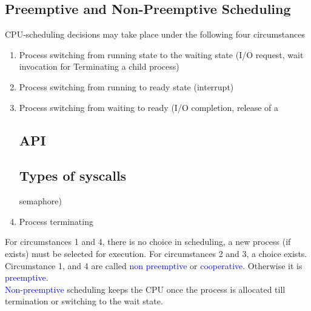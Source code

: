 \documentclass{book/custombook}
\begin{document}
            \subsection{Preemptive and Non-Preemptive Scheduling}
                CPU-scheduling decisions may take place under the following four circumstances
                \begin{enumerate}
                    \item Process switching from running state to the waiting state (I/O request, wait invocation for Terminating
                    a child process)
                    \item Process switching from running to ready state (interrupt)
                    \item Process switching from waiting to ready (I/O completion, release of a             \subsection{API}
                        \subsection{Types of syscalls}
        semaphore)
                    \item Process terminating
                \end{enumerate}
                For circumstances 1 and 4, there is no choice in scheduling, a new process (if exists) must be
                selected for execution. For circumstances 2 and 3, a choice exists.\\
                Circumstance 1, and 4 are called \textcolor{blue}{non preemptive} or \textcolor{blue}{cooperative}.
                Otherwise it is \textcolor{blue}{preemptive}.\\
                \textcolor{blue}{Non-preemptive} scheduling keeps the CPU once the process is allocated till termination
                or switching to the wait state.
\end{document}
